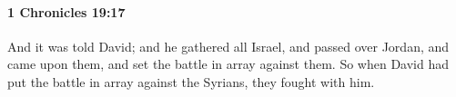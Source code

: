 
		\paragraph{1 Chronicles 19:17} %
			\label{1CHRONICLES-19-17}

			And it was told David; and he gathered all Israel, and passed over Jordan, and came upon them, and set the battle in array against them. So when David had put the battle in array against the Syrians, they fought with him.


